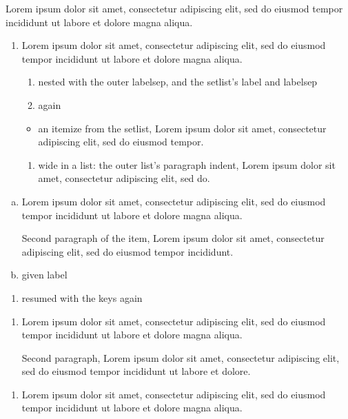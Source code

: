 \documentclass{article}
\begin{document}
Lorem ipsum dolor sit amet, consectetur adipiscing elit, sed do eiusmod tempor incididunt ut labore et dolore magna aliqua.
\begin{enumerate}[leftmargin=*, labelsep=1em, itemsep=2pt plus 1pt, topsep=3pt]
\item Lorem ipsum dolor sit amet, consectetur adipiscing elit, sed do eiusmod tempor incididunt ut labore et dolore magna aliqua.
\begin{enumerate}[leftmargin=*]
\item nested with the outer labelsep, and the setlist's label and labelsep
\item again
\end{enumerate}
\begin{itemize}
\item an itemize from the setlist, Lorem ipsum dolor sit amet, consectetur adipiscing elit, sed do eiusmod tempor.
\end{itemize}
\begin{enumerate}[wide]
\item wide in a list: the outer list's paragraph indent, Lorem ipsum dolor sit amet, consectetur adipiscing elit, sed do.
\end{enumerate}
\end{enumerate}
\begin{enumerate}[(a), font=\bfseries, align=left, labelwidth=2em, parsep=4pt]
\item Lorem ipsum dolor sit amet, consectetur adipiscing elit, sed do eiusmod tempor incididunt ut labore et dolore magna aliqua.

Second paragraph of the item, Lorem ipsum dolor sit amet, consectetur adipiscing elit, sed do eiusmod tempor incididunt.
\item[x] given label
\end{enumerate}
\begin{enumerate}[resume*]
\item resumed with the keys again
\end{enumerate}
\begin{enumerate}[wide, labelindent=0pt, font=\itshape]
\item Lorem ipsum dolor sit amet, consectetur adipiscing elit, sed do eiusmod tempor incididunt ut labore et dolore magna aliqua.

Second paragraph, Lorem ipsum dolor sit amet, consectetur adipiscing elit, sed do eiusmod tempor incididunt ut labore et dolore.
\end{enumerate}
\begin{enumerate}[wide=1em, nolistsep, partopsep=5pt]
\item Lorem ipsum dolor sit amet, consectetur adipiscing elit, sed do eiusmod tempor incididunt ut labore et dolore magna aliqua.
\end{enumerate}
\end{document}
